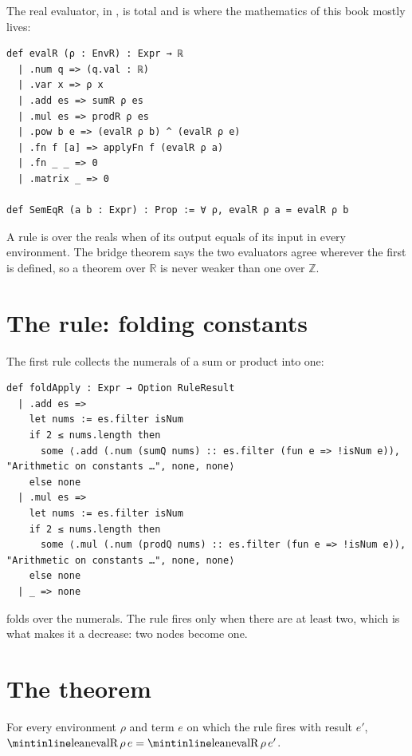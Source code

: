 The real evaluator, in , is total and is where the mathematics of this book mostly
lives:

\begin{verbatim}
def evalR (ρ : EnvR) : Expr → ℝ
  | .num q => (q.val : ℝ)
  | .var x => ρ x
  | .add es => sumR ρ es
  | .mul es => prodR ρ es
  | .pow b e => (evalR ρ b) ^ (evalR ρ e)
  | .fn f [a] => applyFn f (evalR ρ a)
  | .fn _ _ => 0
  | .matrix _ => 0

def SemEqR (a b : Expr) : Prop := ∀ ρ, evalR ρ a = evalR ρ b
\end{verbatim}

A rule is  over the reals when  of its output equals  of its
input in every environment. The bridge theorem  says the two evaluators agree
wherever the first is defined, so a theorem over $\mathbb{R}$ is never weaker than one over
$\mathbb{Z}$.

\section{The rule: folding constants}

The first rule collects the numerals of a sum or product into one:

\begin{verbatim}
def foldApply : Expr → Option RuleResult
  | .add es =>
    let nums := es.filter isNum
    if 2 ≤ nums.length then
      some ⟨.add (.num (sumQ nums) :: es.filter (fun e => !isNum e)), "Arithmetic on constants …", none, none⟩
    else none
  | .mul es =>
    let nums := es.filter isNum
    if 2 ≤ nums.length then
      some ⟨.mul (.num (prodQ nums) :: es.filter (fun e => !isNum e)), "Arithmetic on constants …", none, none⟩
    else none
  | _ => none
\end{verbatim}

 folds  over the numerals. The rule fires only when there are at least two,
which is what makes it a decrease: two nodes become one.

\section{The theorem}

\begin{thmbox}
  For every environment $\rho$ and term $e$ on which the rule fires with result $e'$,
  $\lc{evalR}\,\rho\,e = \lc{evalR}\,\rho\,e'$.
\end{thmbox}

